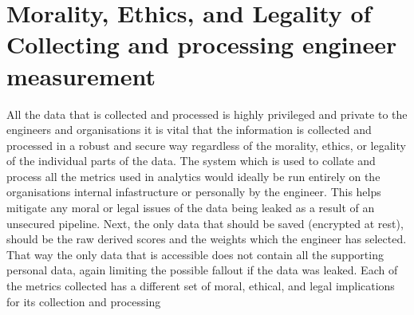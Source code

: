 \documentclass[11pt]{article}
\begin{document}
    \section{Morality, Ethics, and Legality of Collecting and processing engineer measurement}
    All the data that is collected and processed is highly privileged and private to the engineers and organisations it is vital that the information is collected and processed in a robust and secure way regardless of the morality, ethics, or legality of the individual parts of the data. The system which is used to collate and process all the metrics used in analytics would ideally be run entirely on the organisations internal infastructure or personally by the engineer. This helps mitigate any moral or legal issues of the data being leaked as a result of an unsecured pipeline. Next, the only data that should be saved (encrypted at rest), should be the raw derived scores and the weights which the engineer has selected. That way the only data that is accessible does not contain all the supporting personal data, again limiting the possible fallout if the data was leaked. Each of the metrics collected has a different set of moral, ethical, and legal implications for its collection and processing
\end{document}

